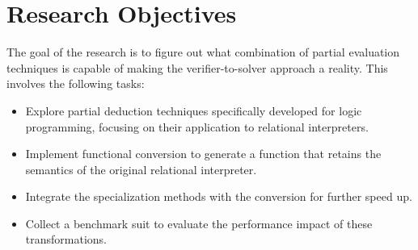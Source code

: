 \section{Research Objectives}

The goal of the research is to figure out what combination of partial evaluation techniques is
capable of making the verifier-to-solver approach a reality.
This involves the following tasks: 

\begin{itemize}
  \item Explore partial deduction techniques specifically developed for logic programming, focusing on their application to relational interpreters. 
  \item Implement functional conversion to generate a function that retains the semantics of the original relational interpreter. 
  \item Integrate the specialization methods with the conversion for further speed up. 
  \item Collect a benchmark suit to evaluate the performance impact of these transformations. 
\end{itemize}